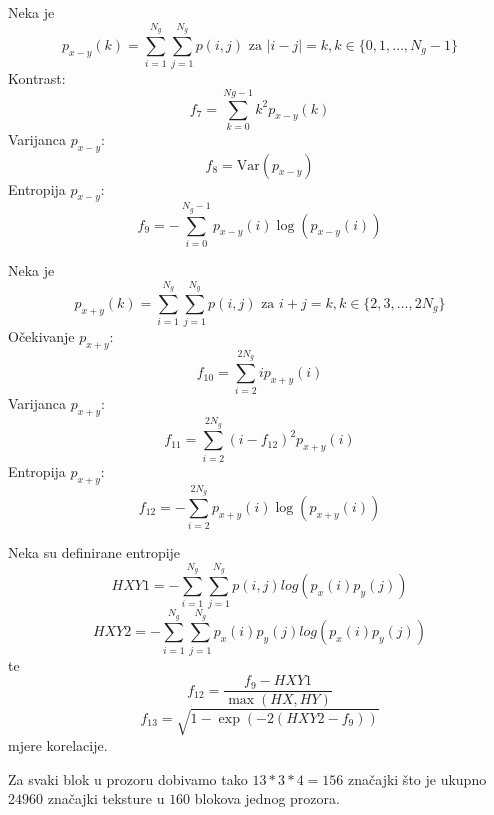 \documentclass[seminar]{fer}
\begin{document}
Neka je 
\begin{equation*}
p_{x - y}(k) = \sum_{i = 1}^{N_g} \sum_{j = 1}^{N_g}p(i, j)   \mbox{ za } |i - j| = k, k \in \{0, 1, \dots, N_g - 1\}
\end{equation*}
Kontrast:
\begin{equation*}
f_7 = \sum_{k = 0}^{Ng - 1} k ^ 2  p_{x - y}(k)
\end{equation*}
Varijanca $p_{x - y}$:
\begin{equation*}
f_{8} = \mathrm{Var}(p_{x - y}) 
\end{equation*}
Entropija $p_{x - y}$:
\begin{equation*}
f_{9} = -\sum_{i = 0}^{N_g - 1} p_{x - y}(i) \log(p_{x - y}(i))
\end{equation*}

Neka je 
\begin{equation*}
p_{x + y}(k) = \sum_{i = 1}^{N_g} \sum_{j = 1}^{N_g}p(i, j) \mbox{ za } i + j = k, k \in \{2, 3, \dots, 2 N_g\}
\end{equation*}
Očekivanje $p_{x + y}$:
\begin{equation*}
f_{10} = \sum_{i = 2}^{2 N_g} i p_{x + y}(i)
\end{equation*}
Varijanca $p_{x + y}$:
\begin{equation*}
f_{11} = \sum_{i = 2}^{2 N_g} (i - f_{12})^2 p_{x + y}(i)
\end{equation*}
Entropija $p_{x + y}$:
\begin{equation*}
f_{12} = - \sum_{i = 2}^{2 N_g} p_{x + y}(i) \log(p_{x + y}(i))
\end{equation*}

Neka su definirane entropije 
\begin{equation*}
HXY1 = - \sum_{i = 1}^{N_g} \sum_{j = 1}^{N_g} p(i, j)	log(p_x(i) p_y(j))
\end{equation*}
\begin{equation*}
HXY2 = - \sum_{i = 1}^{N_g} \sum_{j = 1}^{N_g} p_x(i) p_y(j) log(p_x(i)p_y(j))
\end{equation*}
te
\begin{equation*}
f_{12} = \frac{f_9 - HXY1}{\max(HX, HY)}
\end{equation*}
\begin{equation*}
f_{13} = \sqrt{1 - \exp(-2(HXY2 - f_9))}
	\end{equation*}
mjere korelacije. 

Za svaki blok u prozoru dobivamo tako $13 * 3 * 4 = 156$ značajki što je ukupno $24960$ značajki teksture u $160$ blokova jednog prozora.
\end{document}
